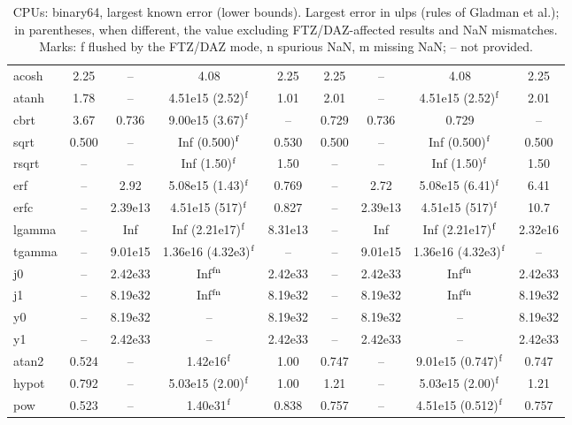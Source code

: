 \begin{table}
\begin{small}
\begin{tabular}{|l|cccc|cccc|}
acosh & 2.25 & -- & 4.08 & 2.25 & 2.25 & -- & 4.08 & 2.25 \\
atanh & 1.78 & -- & 4.51e15 (2.52)$^{\rm f}$ & 1.01 & 2.01 & -- & 4.51e15 (2.52)$^{\rm f}$ & 2.01 \\
cbrt & 3.67 & 0.736 & 9.00e15 (3.67)$^{\rm f}$ & -- & 0.729 & 0.736 & 0.729 & -- \\
sqrt & 0.500 & -- & Inf (0.500)$^{\rm f}$ & 0.530 & 0.500 & -- & Inf (0.500)$^{\rm f}$ & 0.500 \\
rsqrt & -- & -- & Inf (1.50)$^{\rm f}$ & 1.50 & -- & -- & Inf (1.50)$^{\rm f}$ & 1.50 \\
erf & -- & 2.92 & 5.08e15 (1.43)$^{\rm f}$ & 0.769 & -- & 2.72 & 5.08e15 (6.41)$^{\rm f}$ & 6.41 \\
erfc & -- & 2.39e13 & 4.51e15 (517)$^{\rm f}$ & 0.827 & -- & 2.39e13 & 4.51e15 (517)$^{\rm f}$ & 10.7 \\
lgamma & -- & Inf & Inf (2.21e17)$^{\rm f}$ & 8.31e13 & -- & Inf & Inf (2.21e17)$^{\rm f}$ & 2.32e16 \\
tgamma & -- & 9.01e15 & 1.36e16 (4.32e3)$^{\rm f}$ & -- & -- & 9.01e15 & 1.36e16 (4.32e3)$^{\rm f}$ & -- \\
j0 & -- & 2.42e33 & Inf$^{\rm fn}$ & 2.42e33 & -- & 2.42e33 & Inf$^{\rm fn}$ & 2.42e33 \\
j1 & -- & 8.19e32 & Inf$^{\rm fn}$ & 8.19e32 & -- & 8.19e32 & Inf$^{\rm fn}$ & 8.19e32 \\
y0 & -- & 8.19e32 & -- & 8.19e32 & -- & 8.19e32 & -- & 8.19e32 \\
y1 & -- & 2.42e33 & -- & 2.42e33 & -- & 2.42e33 & -- & 2.42e33 \\
\hline
atan2 & 0.524 & -- & 1.42e16$^{\rm f}$ & 1.00 & 0.747 & -- & 9.01e15 (0.747)$^{\rm f}$ & 0.747 \\
hypot & 0.792 & -- & 5.03e15 (2.00)$^{\rm f}$ & 1.00 & 1.21 & -- & 5.03e15 (2.00)$^{\rm f}$ & 1.21 \\
pow & 0.523 & -- & 1.40e31$^{\rm f}$ & 0.838 & 0.757 & -- & 4.51e15 (0.512)$^{\rm f}$ & 0.757 \\
\hline
\end{tabular}
\end{small}
\caption{CPUs: binary64, largest known error (lower bounds). Largest error in ulps (rules of Gladman et al.); in parentheses, when different, the value excluding FTZ/DAZ-affected results and NaN mismatches. Marks: f flushed by the FTZ/DAZ mode, n spurious NaN, m missing NaN; -- not provided.}
\label{tab:b64cpu}
\end{table}
